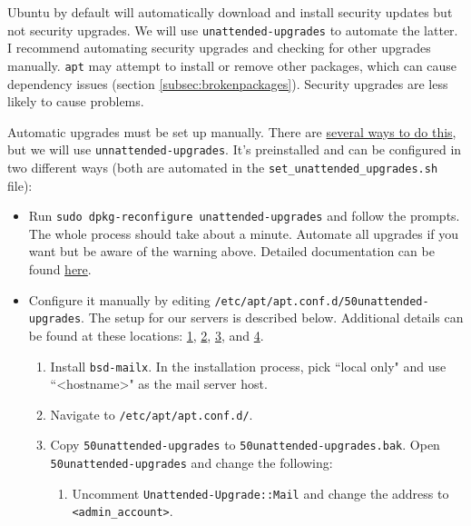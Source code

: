 Ubuntu by default will automatically download and install security updates but not security upgrades. We will use \texttt{unattended-upgrades} to automate the latter. I recommend automating security upgrades and checking for other upgrades manually. \texttt{apt} may attempt to install or remove other packages, which can cause dependency issues (section \ref{subsec:brokenpackages}). Security upgrades are less likely to cause problems.

Automatic upgrades must be set up manually. There are \href{https://help.ubuntu.com/community/AutomaticSecurityUpdates}{several ways to do this}, but we will use \texttt{unnattended-upgrades}. It's preinstalled and can be configured in two different ways (both are automated in the \texttt{set\_unattended\_upgrades.sh} file):

\begin{itemize}
\item Run \texttt{sudo dpkg-reconfigure unattended-upgrades} and follow the prompts. The whole process should take about a minute. Automate all upgrades if you want but be aware of the warning above. Detailed documentation can be found \href{https://help.ubuntu.com/lts/serverguide/automatic-updates.html}{here}.

\item Configure it manually by editing \texttt{/etc/apt/apt.conf.d/50unattended-upgrades}. The setup for our servers is described below. Additional details can be found at these locations:
\href{https://libre-software.net/ubuntu-automatic-updates/}{1}, 
\href{https://www.howtoforge.com/tutorial/how-to-setup-automatic-security-updates-on-ubuntu-1604/}{2}, 
\href{https://linoxide.com/ubuntu-how-to/enable-disable-unattended-upgrades-ubuntu-16-04/}{3}, and 
\href{https://www.linuxbabe.com/ubuntu/automatic-security-update-unattended-upgrades-ubuntu-18-04}{4}. 

	\begin{enumerate}
	\item Install \texttt{bsd-mailx}. In the installation process, pick ``local only" and use ``<hostname>" as the mail server host.

	\item Navigate to \texttt{/etc/apt/apt.conf.d/}.

	\item Copy \texttt{50unattended-upgrades} to \texttt{50unattended-upgrades.bak}. Open \texttt{50unattended-upgrades} and change the following:
		\begin{enumerate}
		\item Uncomment \texttt{Unattended-Upgrade::Mail} and change the address to \texttt{<admin\_account>}. 


\end{enumerate}
\end{enumerate}
\end{itemize}
